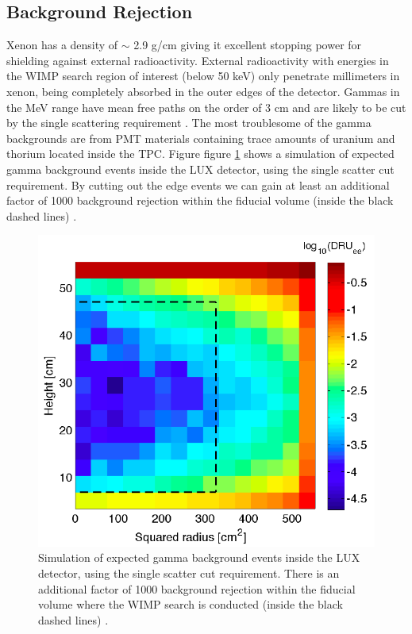 \subsection{Background Rejection}
\label{sec:BG_Rejection}
Xenon has a density of $\sim$ 2.9 g/cm giving it excellent stopping power for shielding against external radioactivity. External radioactivity with energies in the WIMP search region of interest (below 50 keV) only penetrate millimeters in xenon, being completely absorbed in the outer edges of the detector. Gammas in the MeV range have mean free paths on the order of 3 cm and are likely to be cut by the single scattering requirement . The most troublesome of the gamma backgrounds are from PMT materials containing trace amounts of uranium and thorium located inside the TPC. Figure figure \ref{fig:LUX_BG_Rejection} shows a simulation of expected gamma background events inside the LUX detector, using the single scatter cut requirement. By cutting out the edge events we can gain at least an additional factor of 1000 background rejection within the fiducial volume (inside the black dashed lines) \cite{LUX_BG}.

 \begin{figure}[h!]\centering
\includegraphics[scale=.4]{Chapter_LUX_Det/BG_Rejection.png}
\caption{Simulation of expected gamma background events inside the LUX detector, using the single scatter cut requirement\cite{LUX_BG}. There is an additional factor of 1000 background rejection within the fiducial volume where the WIMP search is conducted (inside the black dashed lines) .}
\label{fig:LUX_BG_Rejection}
\end{figure}

